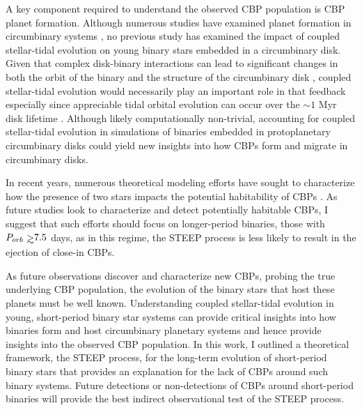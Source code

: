 A key component required to understand the observed CBP population is CBP planet formation.  Although numerous studies have examined planet formation in circumbinary systems \citep[e.g.][]{Alexander2012,Paardekooper2012,Meschiari2012a,Meschiari2012b,Pelupessy2013,Bromley2015,Vartanyan2016}, no previous study has examined the impact of coupled stellar-tidal evolution on young binary stars embedded in a circumbinary disk.  Given that complex disk-binary interactions can lead to significant changes in both the orbit of the binary and the structure of the circumbinary disk \citep[e.g.][]{Fleming2017}, coupled stellar-tidal evolution would necessarily play an important role in that feedback especially since appreciable tidal orbital evolution can occur over the ${\sim}1$ Myr disk lifetime \citep{Haisch2001}.  Although likely computationally non-trivial, accounting for coupled stellar-tidal evolution in simulations of binaries embedded in protoplanetary circumbinary disks could yield new insights into how CBPs form and migrate in circumbinary disks.

In recent years, numerous theoretical modeling efforts have sought to characterize how the presence of two stars impacts the potential habitability of CBPs \citep[e.g.][]{Kane2013,Forgan2014,Popp2017}.  As future studies look to characterize and detect potentially habitable CBPs, I suggest that such efforts should focus on longer-period binaries, those with $P_{orb} \gsim 7.5$ days, as in this regime, the STEEP process is less likely to result in the ejection of close-in CBPs.

As future observations discover and characterize new CBPs, probing the true underlying CBP population, the evolution of the binary stars that host these planets must be well known.    Understanding coupled stellar-tidal evolution in young, short-period binary star systems can provide critical insights into how binaries form and host circumbinary planetary systems and hence provide insights into the observed CBP population.  In this work, I outlined a theoretical framework, the STEEP process, for the long-term evolution of short-period binary stars that provides an explanation for the lack of CBPs around such binary systems.  Future detections or non-detections of CBPs around short-period binaries will provide the best indirect observational test of the STEEP process.

